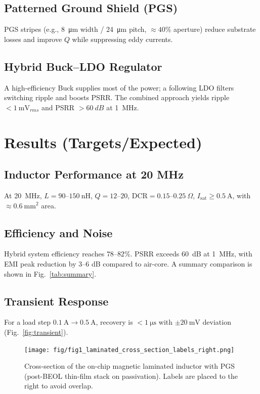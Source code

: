 \documentclass[journal]{IEEEtran}
\begin{document}
\subsection{Patterned Ground Shield (PGS)}
PGS stripes (e.g., \SI{8}{\micro\meter} width / \SI{24}{\micro\meter} pitch, $\approx\!40\%$ aperture) reduce substrate losses and improve $Q$ while suppressing eddy currents.

\subsection{Hybrid Buck--LDO Regulator}
A high-efficiency Buck supplies most of the power; a following LDO filters switching ripple and boosts PSRR. The combined approach yields ripple $<\SI{1}{\milli\volt_{rms}}$ and PSRR $>\SI{60}{dB}$ at \SI{1}{\mega\hertz}.

\section{Results (Targets/Expected)}
\subsection{Inductor Performance at 20 MHz}
At \SI{20}{\mega\hertz}, $L=90$--$150~\mathrm{nH}$, $Q=12$--$20$, $\mathrm{DCR}=0.15$--$0.25~\Omega$, $I_\mathrm{sat}\ge0.5~\mathrm{A}$, with $\approx\SI{0.6}{\milli\meter^2}$ area.

\subsection{Efficiency and Noise}
Hybrid system efficiency reaches $78$--$82\%$. PSRR exceeds \SI{60}{dB} at \SI{1}{\mega\hertz}, with EMI peak reduction by 3--6 dB compared to air-core. A summary comparison is shown in Fig.~\ref{tab:summary}.

\subsection{Transient Response}
For a load step $0.1~\mathrm{A} \rightarrow 0.5~\mathrm{A}$, recovery is $<\SI{1}{\micro\second}$ with $\pm\SI{20}{\milli\volt}$ deviation (Fig.~\ref{fig:transient}).


\begin{figure}[t]
  \centering
  \texttt{[image: fig/fig1\_laminated\_cross\_section\_labels\_right.png]}
  \caption{Cross-section of the on-chip magnetic laminated inductor with PGS (post-BEOL thin-film stack on passivation). Labels are placed to the right to avoid overlap.}
  \label{fig:cross}
\end{figure}
\end{document}
